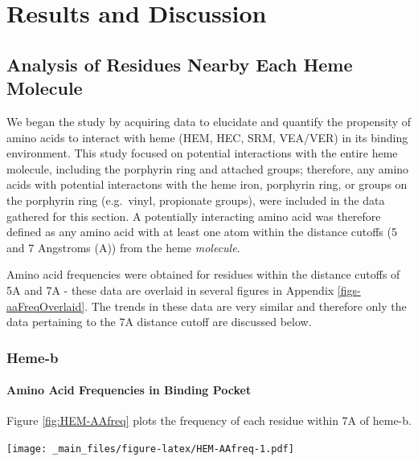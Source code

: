 \documentclass[a4paper, nobind]{templates/ociamthesis}
\let\origfigure\figure
\let\endorigfigure\endfigure
\renewenvironment{figure}[1][2] {
    \expandafter\origfigure\expandafter[H]
} {
    \endorigfigure
}
\begin{document}
\adjustmtc
{}

\adjustmtc
{}

\hypertarget{discussion}{%
\chapter{Results and Discussion}\label{discussion}}

\hypertarget{disc-aaFreq}{%
\section{Analysis of Residues Nearby Each Heme Molecule}\label{disc-aaFreq}}

We began the study by acquiring data to elucidate and quantify the propensity of amino acids to interact with heme (HEM, HEC, SRM, VEA/VER) in its binding environment. This study focused on potential interactions with the entire heme molecule, including the porphyrin ring and attached groups; therefore, any amino acids with potential interactons with the heme iron, porphyrin ring, or groups on the porphyrin ring (e.g.~vinyl, propionate groups), were included in the data gathered for this section. A potentially interacting amino acid was therefore defined as any amino acid with at least one atom within the distance cutoffs (5 and 7 Angstroms (A)) from the heme \emph{molecule}.

Amino acid frequencies were obtained for residues within the distance cutoffs of 5A and 7A - these data are overlaid in several figures in Appendix \ref{figs-aaFreqOverlaid}. The trends in these data are very similar and therefore only the data pertaining to the 7A distance cutoff are discussed below.

\hypertarget{heme-b-1}{%
\subsection{Heme-b}\label{heme-b-1}}

\hypertarget{amino-acid-frequencies-in-binding-pocket}{%
\subsubsection{Amino Acid Frequencies in Binding Pocket}\label{amino-acid-frequencies-in-binding-pocket}}

Figure \ref{fig:HEM-AAfreq} plots the frequency of each residue within 7A of heme-b.

\begin{figure}
\centering
\texttt{[image: \_main\_files/figure-latex/HEM-AAfreq-1.pdf]}
\caption{\label{fig:HEM-AAfreq}HEM: AA Frequency within 7A}
\end{figure}
\end{document}
